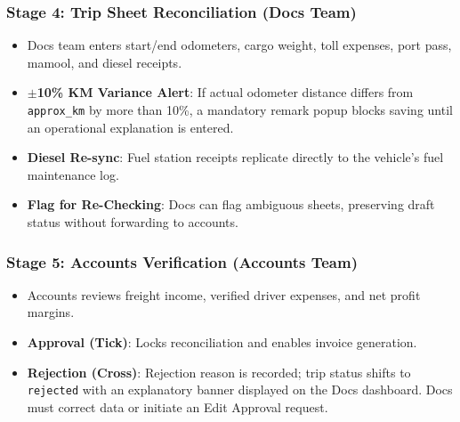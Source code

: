 \documentclass[11pt,a4paper]{article}
\begin{document}
\subsubsection{Stage 4: Trip Sheet Reconciliation (Docs Team)}
\begin{itemize}[leftmargin=1.2em,itemsep=3pt]
  \item Docs team enters start/end odometers, cargo weight, toll expenses, port pass, mamool, and diesel receipts.
  \item \textbf{$\pm$10\% KM Variance Alert}: If actual odometer distance differs from \texttt{approx\_km} by more than 10\%, a mandatory remark popup blocks saving until an operational explanation is entered.
  \item \textbf{Diesel Re-sync}: Fuel station receipts replicate directly to the vehicle's fuel maintenance log.
  \item \textbf{Flag for Re-Checking}: Docs can flag ambiguous sheets, preserving draft status without forwarding to accounts.
\end{itemize}

\subsubsection{Stage 5: Accounts Verification (Accounts Team)}
\begin{itemize}[leftmargin=1.2em,itemsep=3pt]
  \item Accounts reviews freight income, verified driver expenses, and net profit margins.
  \item \textbf{Approval (Tick)}: Locks reconciliation and enables invoice generation.
  \item \textbf{Rejection (Cross)}: Rejection reason is recorded; trip status shifts to \texttt{rejected} with an explanatory banner displayed on the Docs dashboard. Docs must correct data or initiate an Edit Approval request.
\end{itemize}
\end{document}
